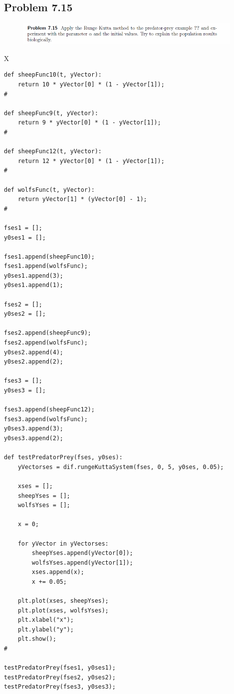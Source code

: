 \subsection{Problem 7.15}


\begin{figure}[!ht]
\includegraphics[width=1\textwidth]{chapters/images/desc-7-15}
\end{figure}



X

\begin{lstlisting}[caption=todo]
def sheepFunc10(t, yVector):
	return 10 * yVector[0] * (1 - yVector[1]);
#

def sheepFunc9(t, yVector):
	return 9 * yVector[0] * (1 - yVector[1]);
#

def sheepFunc12(t, yVector):
	return 12 * yVector[0] * (1 - yVector[1]);
#

def wolfsFunc(t, yVector):
	return yVector[1] * (yVector[0] - 1);
#

fses1 = [];
y0ses1 = [];

fses1.append(sheepFunc10);
fses1.append(wolfsFunc);
y0ses1.append(3);
y0ses1.append(1);

fses2 = [];
y0ses2 = [];

fses2.append(sheepFunc9);
fses2.append(wolfsFunc);
y0ses2.append(4);
y0ses2.append(2);

fses3 = [];
y0ses3 = [];

fses3.append(sheepFunc12);
fses3.append(wolfsFunc);
y0ses3.append(3);
y0ses3.append(2);

def testPredatorPrey(fses, y0ses):
	yVectorses = dif.rungeKuttaSystem(fses, 0, 5, y0ses, 0.05);
	
	xses = [];
	sheepYses = [];
	wolfsYses = [];
	
	x = 0;
	
	for yVector in yVectorses:
		sheepYses.append(yVector[0]);
		wolfsYses.append(yVector[1]);
		xses.append(x);
		x += 0.05;
	
	plt.plot(xses, sheepYses);
	plt.plot(xses, wolfsYses);
	plt.xlabel("x");
	plt.ylabel("y");
	plt.show();
#

testPredatorPrey(fses1, y0ses1);
testPredatorPrey(fses2, y0ses2);
testPredatorPrey(fses3, y0ses3);
\end{lstlisting}


